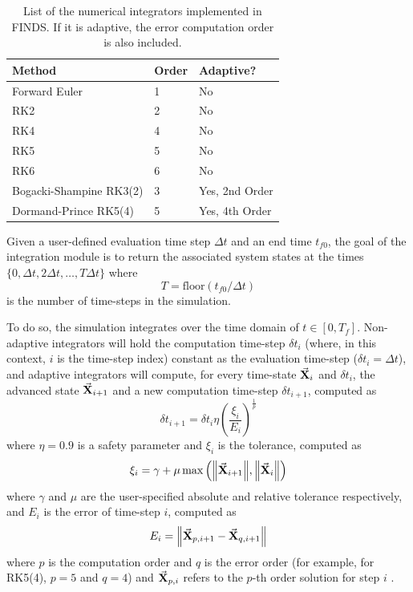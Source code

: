 \documentclass[letterpaper, 10pt, twoside]{LTJournalArticle}
\begin{document}
\begin{table}[htbp]
  \centering
  \begin{tabular}{lll}
    \textbf{Method}         & \textbf{Order} & \textbf{Adaptive?} \\ \hline
    Forward Euler           & 1              & No                 \\
    RK2                     & 2              & No                 \\
    RK4                     & 4              & No                 \\
    RK5                     & 5              & No                 \\
    RK6                     & 6              & No                 \\
    Bogacki-Shampine RK3(2) & 3              & Yes, 2nd Order     \\
    Dormand-Prince RK5(4)   & 5              & Yes, 4th Order
  \end{tabular}
  \caption{List of the numerical integrators implemented in FINDS. If it is
    adaptive, the error computation order is also included.}
  \label{tbl-integrators}
\end{table}

Given a user-defined evaluation time step $\Delta t$ and an end time $t_{f0}$,
the goal of the integration module is to return the associated system states at
the times $\{ 0, \Delta t, 2 \Delta t, \dots, T \Delta t \}$ where
\begin{equation}\label{eq-number-of-time-steps}
  T = \text{floor}(t_{f0} / \Delta t)
\end{equation}
is the number of time-steps in the simulation.

To do so, the simulation integrates over the time domain of $t \in [0,T_f]$.
Non-adaptive integrators will hold the computation time-step $\delta t_i$
(where, in this context, $i$ is the time-step index) constant as the evaluation
time-step ($\delta t_i = \Delta t$), and adaptive integrators will compute,
for every time-state $\va{X}_i$ and $\delta t_i$, the advanced state
$\va{X}_{i+1}$ and a new computation time-step $\delta t_{i+1}$, computed as
\begin{equation}\label{eq-adapted-time-step}
  \delta t_{i+1} = \delta t_i \eta \left( \frac{\xi_i}{E_i} \right)^{\frac{1}{p}}
\end{equation}
where $\eta=0.9$ is a safety parameter and $\xi_i$ is the
tolerance, computed as
\begin{equation}\label{eq-adapted-tolerance}
  \xi_i = \gamma + \mu \max\left(\norm{\va{X}_{i+1}}, \norm{\va{X}_i}\right)
\end{equation}
where $\gamma$ and $\mu$ are the user-specified absolute and relative tolerance
respectively, and $E_i$ is the error of time-step $i$, computed as
\begin{equation}\label{eq-error}
  E_i = \norm{\va{X}_{p,i+1} - \va{X}_{q,i+1}}
\end{equation}
where $p$ is the computation order and $q$ is the error order (for example, for
RK5(4), $p=5$ and $q=4$) and $\va{X}_{p,i}$ refers to the $p$-th order solution
for step $i$ \cite{sundnes_2024}.
\end{document}
